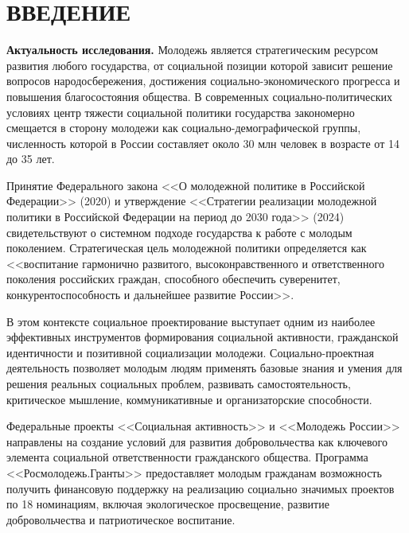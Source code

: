 \documentclass[14pt,a4paper]{extarticle}
\begin{document}
\setcounter{page}{2}

\renewcommand{\contentsname}{СОДЕРЖАНИЕ}
\tableofcontents
\thispagestyle{fancy}

\newpage
\section*{ВВЕДЕНИЕ}

\textbf{Актуальность исследования.} Молодежь является стратегическим ресурсом развития любого государства, от социальной позиции которой зависит решение вопросов народосбережения, достижения социально-экономического прогресса и повышения благосостояния общества. В современных социально-политических условиях центр тяжести социальной политики государства закономерно смещается в сторону молодежи как социально-демографической группы, численность которой в России составляет около 30 млн человек в возрасте от 14 до 35 лет.

Принятие Федерального закона <<О молодежной политике в Российской Федерации>> (2020) и утверждение <<Стратегии реализации молодежной политики в Российской Федерации на период до 2030 года>> (2024) свидетельствуют о системном подходе государства к работе с молодым поколением. Стратегическая цель молодежной политики определяется как <<воспитание гармонично развитого, высоконравственного и ответственного поколения российских граждан, способного обеспечить суверенитет, конкурентоспособность и дальнейшее развитие России>>.

В этом контексте социальное проектирование выступает одним из наиболее эффективных инструментов формирования социальной активности, гражданской идентичности и позитивной социализации молодежи. Социально-проектная деятельность позволяет молодым людям применять базовые знания и умения для решения реальных социальных проблем, развивать самостоятельность, критическое мышление, коммуникативные и организаторские способности.

Федеральные проекты <<Социальная активность>> и <<Молодежь России>> направлены на создание условий для развития добровольчества как ключевого элемента социальной ответственности гражданского общества. Программа <<Росмолодежь.Гранты>> предоставляет молодым гражданам возможность получить финансовую поддержку на реализацию социально значимых проектов по 18 номинациям, включая экологическое просвещение, развитие добровольчества и патриотическое воспитание.
\end{document}
